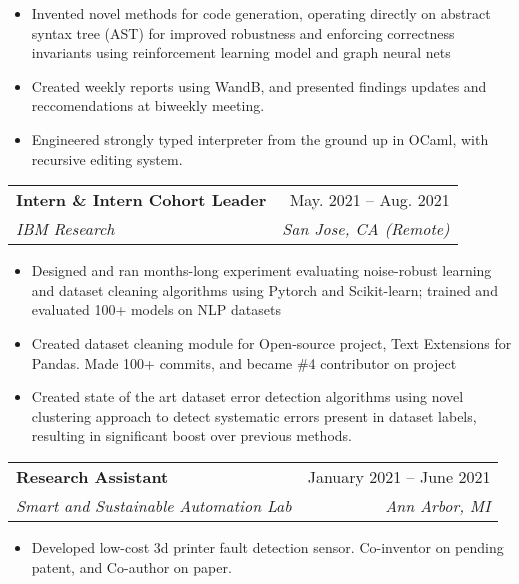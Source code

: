 \documentclass[letterpaper,11pt]{article}
\makeatletter
\newcommand{\resumeItem}[1]{
  \item\small{
    {#1 \vspace{-2pt}}
  }
}
\newcommand{\resumeSubheading}[4]{
  \vspace{-2pt}\item
    \begin{tabular*}{0.97\textwidth}[t]{l@{\extracolsep{\fill}}r}
      \textbf{#1} & #2 \\
      \textit{\small#3} & \textit{\small #4} \\
    \end{tabular*}\vspace{-7pt}
}
\newcommand{\resumeItemListStart}{\begin{itemize}}
\newcommand{\resumeItemListEnd}{\end{itemize}\vspace{-5pt}}
\makeatother
\begin{document}
    \resumeItemListStart
        \resumeItem{
Invented novel methods for code generation, operating directly on abstract syntax tree (AST) for improved robustness and enforcing correctness invariants using reinforcement learning model and graph neural nets 
            }   
        \resumeItem{
Created weekly reports using WandB, and presented findings updates and reccomendations at biweekly meeting. 
        }
       \resumeItem{Engineered strongly typed interpreter from the ground up in OCaml, with recursive editing system.}

    \resumeItemListEnd

    \resumeSubheading
    {Intern \& Intern Cohort Leader}
     {May. 2021 -- Aug. 2021}
     {IBM Research}
     {San Jose, CA (Remote)}

    \resumeItemListStart
        \resumeItem{Designed and ran months-long experiment evaluating noise-robust learning and dataset cleaning algorithms using Pytorch and Scikit-learn; trained and evaluated 100+ models on NLP datasets}
        \resumeItem{Created dataset cleaning module for Open-source project, Text Extensions for Pandas. Made 100+ commits, and became \#4 contributor on project}
        \resumeItem{Created state of the art dataset error detection algorithms using novel clustering approach to detect systematic errors present in dataset labels, resulting in significant boost over previous methods.}
        
    \resumeItemListEnd

\resumeSubheading{Research Assistant}
        {January 2021 – June 2021}
        {Smart and Sustainable Automation Lab}
        {Ann Arbor, MI}
        
    \resumeItemListStart
        \resumeItem{Developed low-cost 3d printer fault detection sensor. Co-inventor on pending patent, and Co-author on paper.}
    \resumeItemListEnd
\end{document}
